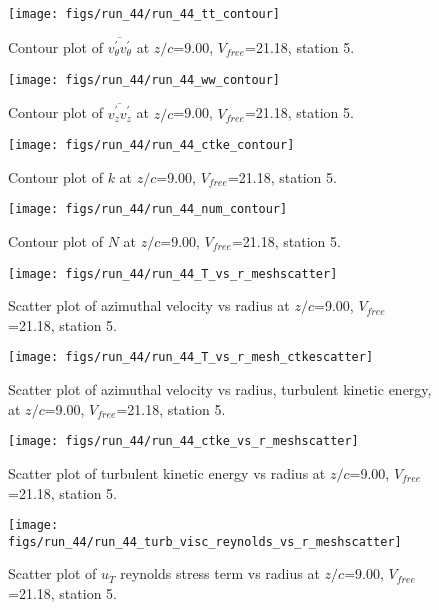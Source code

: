 \begin{figure}[H]
\centering
\texttt{[image: figs/run\_44/run\_44\_tt\_contour]}
\caption{Contour plot of $\overline{v_{\theta}^{\prime} v_{\theta}^{\prime}}$ at $z/c$=9.00, $V_{free}$=21.18, station 5.}
\end{figure}


\begin{figure}[H]
\centering
\texttt{[image: figs/run\_44/run\_44\_ww\_contour]}
\caption{Contour plot of $\overline{v_{z}^{\prime} v_{z}^{\prime}}$ at $z/c$=9.00, $V_{free}$=21.18, station 5.}
\end{figure}


\begin{figure}[H]
\centering
\texttt{[image: figs/run\_44/run\_44\_ctke\_contour]}
\caption{Contour plot of $k$ at $z/c$=9.00, $V_{free}$=21.18, station 5.}
\end{figure}


\begin{figure}[H]
\centering
\texttt{[image: figs/run\_44/run\_44\_num\_contour]}
\caption{Contour plot of $N$ at $z/c$=9.00, $V_{free}$=21.18, station 5.}
\end{figure}


\begin{figure}[H]
\centering
\texttt{[image: figs/run\_44/run\_44\_T\_vs\_r\_meshscatter]}
\caption{Scatter plot of azimuthal velocity vs radius at $z/c$=9.00, $V_{free}$=21.18, station 5.}
\end{figure}


\begin{figure}[H]
\centering
\texttt{[image: figs/run\_44/run\_44\_T\_vs\_r\_mesh\_ctkescatter]}
\caption{Scatter plot of azimuthal velocity vs radius, turbulent kinetic energy, at $z/c$=9.00, $V_{free}$=21.18, station 5.}
\end{figure}


\begin{figure}[H]
\centering
\texttt{[image: figs/run\_44/run\_44\_ctke\_vs\_r\_meshscatter]}
\caption{Scatter plot of turbulent kinetic energy vs radius at $z/c$=9.00, $V_{free}$=21.18, station 5.}
\end{figure}


\begin{figure}[H]
\centering
\texttt{[image: figs/run\_44/run\_44\_turb\_visc\_reynolds\_vs\_r\_meshscatter]}
\caption{Scatter plot of $
u_T$ reynolds stress term vs radius at $z/c$=9.00, $V_{free}$=21.18, station 5.}
\end{figure}


